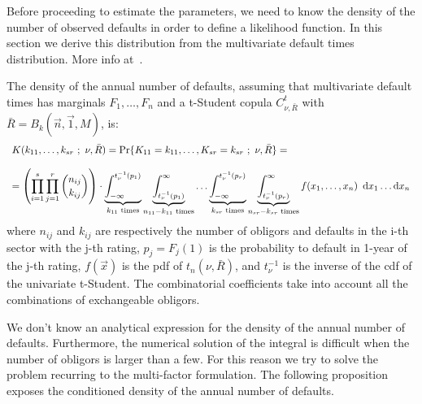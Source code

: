 \documentclass[11pt,fleqn]{book} %
\begin{document}
Before proceeding to estimate the parameters, we need to know the density
of the number of observed defaults in order to define a likelihood 
function. In this section we derive this distribution from the multivariate
default times distribution. More info at~\cite{gordy:2002,roncalli:2004}.

\begin{proposition}
	The density of the annual number of defaults, assuming that multivariate 
	default times has marginals $F_1,\dots,F_n$ and a t-Student copula 
	$C_{\nu,\bar{R}}^t$ with $\bar{R} = B_k(\vec{n},\vec{1},M)$, is:
	\begin{displaymath}
		\begin{array}{l}
			K(k_{11},\dots,k_{sr}\ ;\ \nu, \bar{R}) = 
			\Pr\{K_{11}=k_{11},\dots,K_{sr}=k_{sr}\ ;\ \nu, \bar{R}\} = \\
			\\
			= \left( \displaystyle \prod_{i=1}^s \prod_{j=1}^r \binom{n_{ij}}{k_{ij}} \right) \cdot
			\displaystyle
			\underbrace{\int_{-\infty}^{t_{\nu}^{-1}(p_1)}}_{k_{11} \text{ times}}
			\underbrace{\int_{t_{\nu}^{-1}(p_1)}^{\infty}}_{n_{11}-k_{11} \text{ times}}
			\dots
			\underbrace{\int_{-\infty}^{t_{\nu}^{-1}(p_r)}}_{k_{sr} \text{ times}}
			\underbrace{\int_{t_{\nu}^{-1}(p_r)}^{\infty}}_{n_{sr}-k_{sr} \text{ times}}
			f(x_1,\dots,x_n)\ \mathop{\mathrm{{}d}}\mathopen{} x_1 \dots \mathop{\mathrm{{}d}}\mathopen{} x_n
		\end{array}
	\end{displaymath}
	where $n_{ij}$ and $k_{ij}$ are respectively the number of obligors and 
	defaults in the i-th sector with the j-th rating, $p_j = F_j(1)$ 
	is the probability to default in 1-year of the j-th rating, $f(\vec{x})$ 
	is the pdf of $t_n(\nu,\bar{R})$, and $t_{\nu}^{-1}$ is the inverse of the 
	cdf of the univariate t-Student. The combinatorial coefficients take into 
	account all the combinations of exchangeable obligors.
\end{proposition}

We don't know an analytical expression for the density of the annual number 
of defaults. Furthermore, the numerical solution of the integral is difficult 
when the number of obligors is larger than a few. For this reason we try to 
solve the problem recurring to the multi-factor formulation. The following
proposition exposes the conditioned density of the annual number of defaults.
\end{document}
